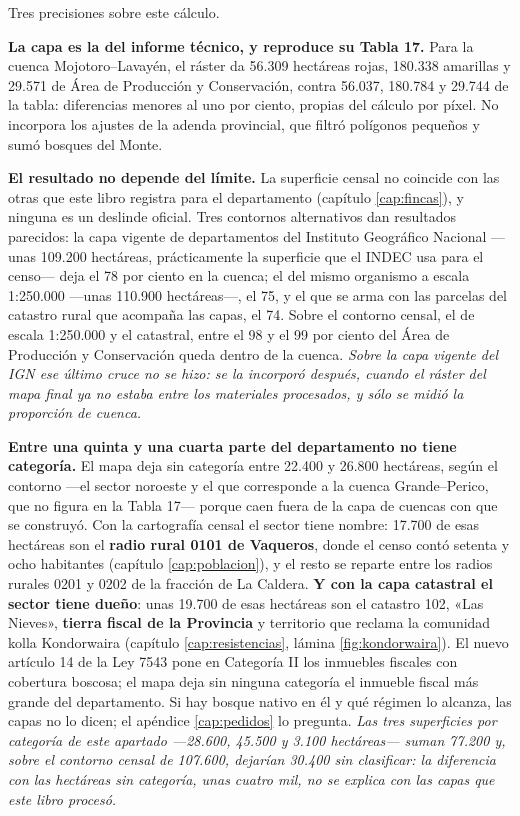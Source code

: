 \begin{cautela}
Tres precisiones sobre este cálculo.

\textbf{La capa es la del informe técnico, y reproduce su Tabla 17.} Para la cuenca Mojotoro--Lavayén, el ráster da 56.309 hectáreas rojas, 180.338 amarillas y 29.571 de Área de Producción y Conservación, contra 56.037, 180.784 y 29.744 de la tabla: diferencias menores al uno por ciento, propias del cálculo por píxel. No incorpora los ajustes de la adenda provincial, que filtró polígonos pequeños y sumó bosques del Monte.

\textbf{El resultado no depende del límite.} La superficie censal no coincide con las otras que este libro registra para el departamento (capítulo \ref{cap:fincas}), y ninguna es un deslinde oficial. Tres contornos alternativos dan resultados parecidos: la capa vigente de departamentos del Instituto Geográfico Nacional ---unas 109.200 hectáreas, prácticamente la superficie que el INDEC usa para el censo--- deja el 78 por ciento en la cuenca; el del mismo organismo a escala 1:250.000 ---unas 110.900 hectáreas---, el 75, y el que se arma con las parcelas del catastro rural que acompaña las capas, el 74. Sobre el contorno censal, el de escala 1:250.000 y el catastral, entre el 98 y el 99 por ciento del Área de Producción y Conservación queda dentro de la cuenca. \textit{Sobre la capa vigente del IGN ese último cruce no se hizo: se la incorporó después, cuando el ráster del mapa final ya no estaba entre los materiales procesados, y sólo se midió la proporción de cuenca.}

\textbf{Entre una quinta y una cuarta parte del departamento no tiene categoría.} El mapa deja sin categoría entre 22.400 y 26.800 hectáreas, según el contorno ---el sector noroeste y el que corresponde a la cuenca Grande--Perico, que no figura en la Tabla 17--- porque caen fuera de la capa de cuencas con que se construyó. Con la cartografía censal el sector tiene nombre: 17.700 de esas hectáreas son el \textbf{radio rural 0101 de Vaqueros}, donde el censo contó setenta y ocho habitantes (capítulo \ref{cap:poblacion}), y el resto se reparte entre los radios rurales 0201 y 0202 de la fracción de La Caldera. \textbf{Y con la capa catastral el sector tiene dueño}: unas 19.700 de esas hectáreas son el catastro 102, «Las Nieves», \textbf{tierra fiscal de la Provincia} y territorio que reclama la comunidad kolla Kondorwaira (capítulo \ref{cap:resistencias}, lámina \ref{fig:kondorwaira}). El nuevo artículo 14 de la Ley 7543 pone en Categoría II los inmuebles fiscales con cobertura boscosa; el mapa deja sin ninguna categoría el inmueble fiscal más grande del departamento. Si hay bosque nativo en él y qué régimen lo alcanza, las capas no lo dicen; el apéndice \ref{cap:pedidos} lo pregunta. \textit{Las tres superficies por categoría de este apartado ---28.600, 45.500 y 3.100 hectáreas--- suman 77.200 y, sobre el contorno censal de 107.600, dejarían 30.400 sin clasificar: la diferencia con las hectáreas sin categoría, unas cuatro mil, no se explica con las capas que este libro procesó.}
\end{cautela}


